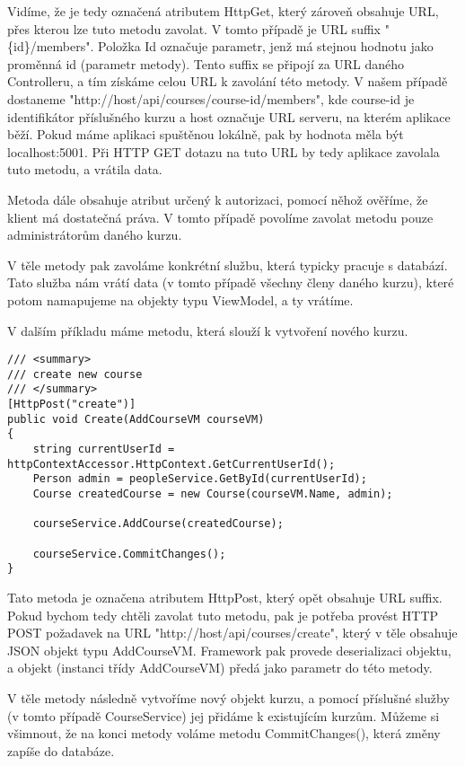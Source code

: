 Vidíme, že je tedy označená atributem HttpGet, který zároveň obsahuje URL, přes kterou lze tuto metodu zavolat. V tomto případě je URL suffix "\{id\}/members". Položka Id označuje parametr, jenž má stejnou hodnotu jako proměnná id (parametr metody). Tento suffix se připojí za URL daného Controlleru, a tím získáme celou URL k zavolání této metody. V našem případě dostaneme
\newline
"http://host/api/courses/course-id/members", kde course-id je identifikátor příslušného kurzu a host označuje URL serveru, na kterém aplikace běží. Pokud máme aplikaci spuštěnou lokálně, pak by hodnota měla být localhost:5001. Při HTTP GET dotazu na tuto URL by tedy aplikace zavolala tuto metodu, a vrátila data.

Metoda dále obsahuje atribut určený k autorizaci, pomocí něhož ověříme, že klient má dostatečná práva. V tomto případě povolíme zavolat metodu pouze administrátorům daného kurzu.

V těle metody pak zavoláme konkrétní službu, která typicky pracuje s databází. Tato služba nám vrátí data (v tomto případě všechny členy daného kurzu), které potom namapujeme na objekty typu ViewModel, a ty vrátíme.

\vspace{\baselineskip}

V dalším příkladu máme metodu, která slouží k vytvoření nového kurzu.
\begin{lstlisting}
/// <summary>
/// create new course
/// </summary>
[HttpPost("create")]
public void Create(AddCourseVM courseVM)
{
	string currentUserId = httpContextAccessor.HttpContext.GetCurrentUserId();
	Person admin = peopleService.GetById(currentUserId);
	Course createdCourse = new Course(courseVM.Name, admin);
	
	courseService.AddCourse(createdCourse);
	
	courseService.CommitChanges();
}
\end{lstlisting}
Tato metoda je označena atributem HttpPost, který opět obsahuje URL suffix. Pokud bychom tedy chtěli zavolat tuto metodu, pak je potřeba provést HTTP POST požadavek na URL
\newline
"http://host/api/courses/create", který v těle obsahuje JSON objekt typu AddCourseVM. Framework pak provede deserializaci objektu, a objekt (instanci třídy AddCourseVM) předá jako parametr do této metody.

V těle metody následně vytvoříme nový objekt kurzu, a pomocí příslušné služby (v tomto případě CourseService) jej přidáme k existujícím kurzům. Můžeme si všimnout, že na konci metody voláme metodu CommitChanges(), která změny zapíše do databáze.

